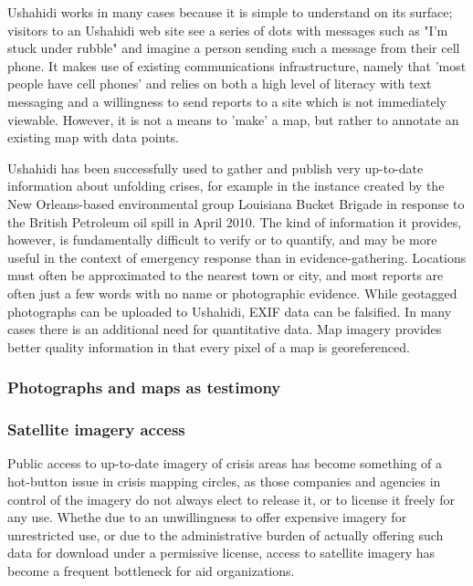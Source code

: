 \documentclass[11pt]{report}
\begin{document}

Ushahidi works in many cases because it is simple to understand on its surface; visitors to an Ushahidi web site see a series of dots with messages such as "I'm stuck under rubble" and imagine a person sending such a message from their cell phone. It makes use of existing communications infrastructure, namely that 'most people have cell phones' and relies on both a high level of literacy with text messaging and a willingness to send reports to a site which is not immediately viewable. However, it is not a means to 'make' a map, but rather to annotate an existing map with data points.

Ushahidi has been successfully used to gather and publish very up-to-date information about unfolding crises, for example in the instance created by the New Orleans-based environmental group Louisiana Bucket Brigade in response to the British Petroleum oil spill in April 2010. The kind of information it provides, however, is fundamentally difficult to verify or to quantify, and may be more useful in the context of emergency response than in evidence-gathering. Locations must often be approximated to the nearest town or city, and most reports are often just a few words with no name or photographic evidence. While geotagged photographs can be uploaded to Ushahidi, EXIF data can be falsified. In many cases there is an additional need for quantitative data. Map imagery provides better quality information in that every pixel of a map is georeferenced.  

\subsubsection{Photographs and maps as testimony}



\subsubsection{Satellite imagery access}

Public access to up-to-date imagery of crisis areas has become something of a hot-button issue in crisis mapping circles, as those companies and agencies in control of the imagery do not always elect to release it, or to license it freely for any use. Whethe due to an unwillingness to offer expensive imagery for unrestricted use, or due to the administrative burden of actually offering such data for download under a permissive license, access to satellite imagery has become a frequent bottleneck for aid organizations. 
\end{document}
